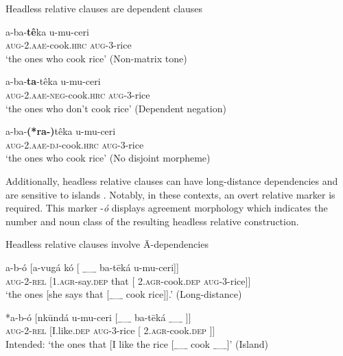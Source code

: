 \documentclass[output=paper,colorlinks,citecolor=brown
]{langscibook}
\begin{document}
\ea Headless relative clauses are dependent clauses
\begin{xlist}

\ex \label{ex:myers:hrctone} \gll a-ba-{\bfseries  tê}ka u-mu-ceri\\
\textsc{aug-2.aae}-cook.\textsc{hrc} \textsc{aug}-3-rice\\
\glt `the ones who cook rice' \hfill{(Non-matrix tone)}

\ex \label{ex:myers:hrcneg} \gll a-ba-{\bfseries  ta}-têka u-mu-ceri\\
\textsc{aug-2.aae-neg}-cook.\textsc{hrc} \textsc{aug}-3-rice\\
\glt `the ones who don't cook rice' \hfill{(Dependent negation)}

\ex \label{ex:myers:hrcdj} \gll a-ba-{\bfseries  (*ra-)}têka u-mu-ceri\\
\textsc{aug-2.aae-dj}-cook.\textsc{hrc} \textsc{aug}-3-rice\\
\glt `the ones who cook rice' \hfill{(No disjoint morpheme)}
\end{xlist}
\z


Additionally, headless relative clauses can have long-distance dependencies  and are sensitive to islands . Notably, in these contexts, an overt relative marker is required. This marker -\emph{ó} displays agreement morphology which indicates the number and noun class of the resulting headless relative construction.

\ea Headless relative clauses involve Ā-dependencies
\begin{xlist}

\ex \label{ex:myers:hrclong} \gll {}a-b-ó [a-vugá kó [ {$\_$\_$\_$} ba-tēká u-mu-ceri]]\\
\textsc{aug}-2-\textsc{rel} [1.\textsc{agr}-say.\textsc{dep} that [ {} 2.\textsc{agr}-cook\textsc{.dep} \textsc{aug}-3-rice]]\\
\glt {}`the ones [she says that [{$\_$\_$\_$} cook rice]].' \hfill{(Long-distance)}

\ex  \label{ex:myers:hrcisland} \gll {}*a-b-ó [nkūndá u-mu-ceri [{$\_$\_$\_$}  ba-tēká {$\_$\_$\_$} ]]\\
\textsc{aug}-2-\textsc{rel} [I.like.\textsc{dep} \textsc{aug}-3-rice [{}  2.\textsc{agr}-cook\textsc{.dep} {} ]]\\
\glt {}Intended: `the ones that [I like the rice [{$\_$\_$\_$} cook {$\_$\_$\_$}]' \hfill{(Island)}

\end{xlist}
\z
\end{document}
